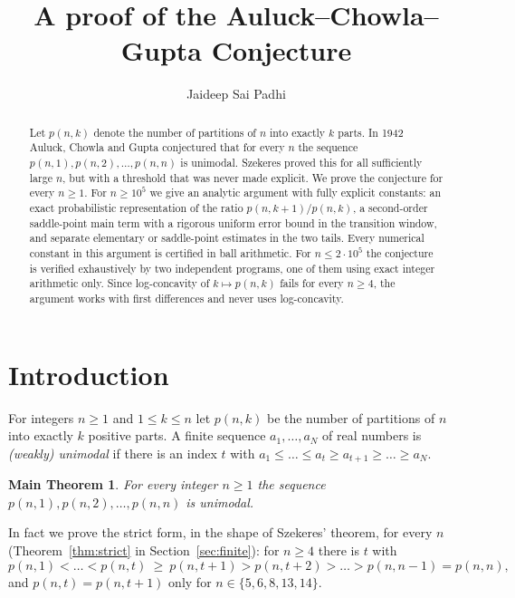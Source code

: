 \documentclass[11pt]{amsart}
\title[The Auluck--Chowla--Gupta conjecture]{A proof of the Auluck--Chowla--Gupta Conjecture}
\author{Jaideep Sai Padhi}
\newtheorem*{maintheorem}{Main Theorem}
\theoremstyle{definition}
\theoremstyle{remark}
\numberwithin{equation}{section}
\begin{document}
\begin{abstract}
Let $p(n,k)$ denote the number of partitions of $n$ into exactly $k$ parts. In 1942 Auluck, Chowla and Gupta
conjectured that for every $n$ the sequence $p(n,1),p(n,2),\dots,p(n,n)$ is unimodal. Szekeres proved this for all
sufficiently large $n$, but with a threshold that was never made explicit. We prove the conjecture for every $n\ge 1$.
For $n\ge 10^5$ we give an analytic argument with fully explicit constants: an exact probabilistic representation of the
ratio $p(n,k+1)/p(n,k)$, a second-order saddle-point main term with a rigorous uniform error bound in the transition window,
and separate elementary or saddle-point estimates in the two tails. Every numerical constant in this argument is certified in
ball arithmetic. For $n\le 2\cdot10^5$ the conjecture is verified exhaustively by two independent programs, one of them using
exact integer arithmetic only. Since log-concavity of $k\mapsto p(n,k)$ fails for every $n\ge 4$, the argument works with
first differences and never uses log-concavity.
\end{abstract}

\maketitle

\section{Introduction}\label{sec:intro}

For integers $n\ge1$ and $1\le k\le n$ let $p(n,k)$ be the number of partitions of $n$ into exactly $k$ positive parts. A finite
sequence $a_1,\dots,a_N$ of real numbers is \emph{(weakly) unimodal} if there is an index $t$ with
$a_1\le\dots\le a_t\ge a_{t+1}\ge\dots\ge a_N$.

\begin{maintheorem}
For every integer $n\ge1$ the sequence $p(n,1),p(n,2),\dots,p(n,n)$ is unimodal.
\end{maintheorem}

\noindent In fact we prove the strict form, in the shape of Szekeres' theorem, for every $n$
(Theorem~\ref{thm:strict} in Section~\ref{sec:finite}): for $n\ge4$ there is $t$ with
\[
  p(n,1)<\dots<p(n,t)\ \ge\ p(n,t+1)>p(n,t+2)>\dots>p(n,n-1)=p(n,n),
\]
and $p(n,t)=p(n,t+1)$ only for $n\in\{5,6,8,13,14\}$.
\end{document}
